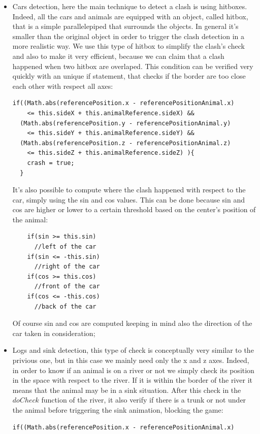 \documentclass[a4paper, 11pt]{article}
\begin{document}
\begin{itemize}
  \item Cars detection, here the main technique to detect a clash is using hitboxes. Indeed, all the cars and animals are equipped with an object, called hitbox, that is a simple parallelepiped that surrounds the objects. In general it's smaller than the original object in order to trigger the clash detection in a more realistic way. We use this type of hitbox to simplify the clash's check and also to make it very efficient, because we can claim that a clash happened when two hitbox are overlaped. This condition can be verified very quickly with an unique if statement, that checks if the border are too close each other with respect all axes:
  \begin{lstlisting}
if((Math.abs(referencePosition.x - referencePositionAnimal.x) 
    <= this.sideX + this.animalReference.sideX) &&
  (Math.abs(referencePosition.y - referencePositionAnimal.y) 
    <= this.sideY + this.animalReference.sideY) &&
  (Math.abs(referencePosition.z - referencePositionAnimal.z) 
    <= this.sideZ + this.animalReference.sideZ) ){
    crash = true;
  }
  \end{lstlisting}
  It's also possible to compute where the clash happened with respect to the car, simply using the sin and cos values. This can be done because sin and cos are higher or lower to a certain threshold based on the center's position of the animal:
  \begin{lstlisting}
    if(sin >= this.sin)
      //left of the car
    if(sin <= -this.sin)
      //right of the car
    if(cos >= this.cos)
      //front of the car
    if(cos <= -this.cos)
      //back of the car
  \end{lstlisting}
  Of course sin and cos are computed keeping in mind also the direction of the car taken in consideration;
  \item Logs and sink detection, this type of check is conceptually very similar to the privious one, but in this case we mainly need only the x and z axes. Indeed, in order to know if an animal is on a river or not we simply check its position in the space with respect to the river. If it is within the border of the river it means that the animal may be in a sink situation. After this check in the $doCheck$ function of the river, it also verify if there is a trunk or not under the animal before triggering the sink animation, blocking the game:
  \begin{lstlisting}
if((Math.abs(referencePosition.x - referencePositionAnimal.x) 

\end{lstlisting}
\end{itemize}
\end{document}
